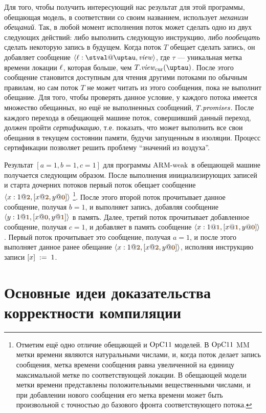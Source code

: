 Для того, чтобы получить интересующий нас результат для этой программы, обещающая модель, в соответствии со своим названием,
использует \emph{механизм обещаний}.
Так, в любой момент исполнения поток может сделать одно из двух следующих действий:
либо выполнить следующую инструкцию, либо \emph{пообещать} сделать некоторую запись в будущем.
Когда поток $T$ обещает сделать запись, он добавляет сообщение $\angled{\loc:\stval@\tau,\R}$, где
$\tau$ --- уникальная метка времени локации $\ell$, которая больше, чем $T.\Rcur(\tau)$.
После этого сообщение становится доступным для чтения другими потоками по обычным правилам, но сам поток $T$
не может читать из этого сообщения, пока не выполнит обещание.
Для того, чтобы проверять данное условие, у каждого потока имеется множество обещанных, но ещё не выполненных сообщений, $T.\mathit{promises}$.
После каждого перехода в обещающей машине поток, совершивший данный переход, должен пройти \emph{сертификацию},
т.е. показать, что может выполнить все свои обещания в текущем состоянии памяти, будучи запущенным в изоляции.
Процесс сертификации позволяет решить проблему ``значений из воздуха''.

Результат $[a = 1, b = 1, c = 1]$ для программы ${\rm ARM\text{-}weak}$ в обещающей машине получается следующим образом.
После выполнения инициализирующих записей и старта дочерних потоков первый поток обещает сообщение
$\angled{x:1@\tstamp{2},[x@\tstamp{2},y@\tstamp{0}]}$%
\footnote{Отметим ещё одно отличие обещающей и $\mathrm{OpC11}$ моделей.
В $\mathrm{OpC11}$ MM метки времени являются натуральными числами, и, когда поток делает запись сообщения,
метка времени сообщения равна увеличенной на единицу максимальной метке по соответствующей локации.
В обещающей модели метки времени представлены положительными вещественными числами, и при добавлении
нового сообщения его метка времени может быть произвольной с точностью до базового фронта соответствующего потока.}.
После этого второй поток прочитывает данное сообщение, получая $b = 1$, и выполняет запись,
добавляя сообщение $\angled{y:1@\tstamp{1},[x@\tstamp{0},y@\tstamp{1}]}$ в память.
Далее, третий поток прочитывает добавленное сообщение, получая $c = 1$, и добавляет в память сообщение
$\angled{x:1@\tstamp{1},[x@\tstamp{1},y@\tstamp{0}]}$.
Первый поток прочитывает это сообщение, получая $a = 1$, и после этого выполняет данное ранее обещание
$\angled{x:1@\tstamp{2},[x@\tstamp{2},y@\tstamp{0}]}$, исполняя инструкцию записи
$[x]\;:=\;1$.

\section{Основные идеи доказательства корректности компиляции}
\label{sec:armpop:highlevel}

